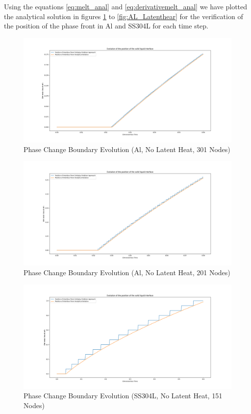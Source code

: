 Using the equations \ref{eq:melt_anal} and \ref{eq:derivativemelt_anal} we have plotted the analytical solution in figures \ref{fig:phasechange} to \ref{fig:AL_Latenthear} for the verification of the position of the phase front in Al and SS304L for each time step.
\begin{figure}[h]
  \centering
  \includegraphics[width=17cm]{img/Evolution_of_the_mushy_zone_for_crystalline_material_under_301_nodes.png}
  \caption{Phase Change Boundary Evolution (Al, No Latent Heat, 301 Nodes)}
  \label{fig:phasechange}
\end{figure}

\begin{figure}[h]
  \centering
  \includegraphics[width=15cm]{img/Evolution_of_the_Mushy_Zone.png}
  \caption{Phase Change Boundary Evolution (Al, No Latent Heat, 201 Nodes)}
  \label{fig:201_Nodes_phasechange}
\end{figure}

\begin{figure}[h]
  \centering
  \includegraphics[width=15cm]{img/Amorphous_No_Latent_Heat_151_nodes.png}
  \caption{Phase Change Boundary Evolution (SS304L, No Latent Heat, 151 Nodes)}
  \label{fig:Amor_phasechange}
\end{figure}


